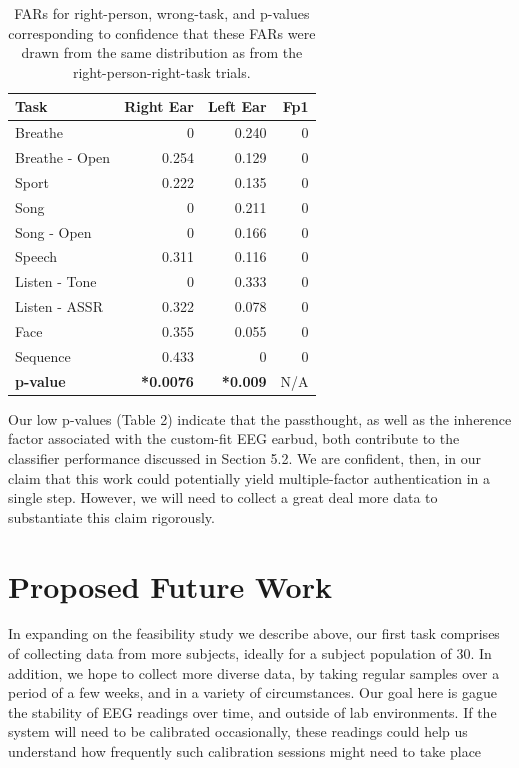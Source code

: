 \documentclass[11pt]{article}
\begin{document}
\begin{table}[h]
\centering
\caption{FARs for right-person, wrong-task, and p-values corresponding to confidence that these FARs were drawn from the same distribution as from the right-person-right-task trials.}
\begin{tabular}{lrrr}
\textbf{Task} & \textbf{Right Ear} & \textbf{Left Ear} & \textbf{Fp1}\\
\hline
Breathe & 0 & 0.240 & 0\\
Breathe - Open & 0.254 & 0.129 & 0\\
Sport & 0.222 & 0.135 & 0\\
Song & 0 & 0.211 & 0\\
Song - Open & 0 & 0.166 & 0\\
Speech & 0.311 & 0.116 & 0\\
Listen - Tone & 0 & 0.333 & 0\\
Listen - ASSR & 0.322 & 0.078 & 0\\
Face & 0.355 & 0.055 & 0\\
Sequence & 0.433 & 0 & 0\\
\hline
\textbf{p-value} & \textbf{*0.0076} & \textbf{*0.009} & N/A\\
\end{tabular}
\end{table}

Our low p-values (Table 2) indicate that the passthought, as well as the inherence
factor associated with the custom-fit EEG earbud, both contribute to the classifier
performance discussed in Section 5.2. We are confident, then, in our claim that this work
could potentially yield multiple-factor authentication in a single step. However, we
will need to collect a great deal more data to substantiate this claim rigorously.

\section{Proposed Future Work}

In expanding on the feasibility study we describe above, 
our first task comprises of collecting data from more subjects,
ideally for a subject population of 30.
In addition, we hope to collect more diverse data,
by taking regular samples over a period of a few weeks,
and in a variety of circumstances. Our goal here is gague the stability
of EEG readings over time, and outside of lab environments.
If the system will need to be calibrated occasionally, these readings
could help us understand how frequently such calibration sessions
might need to take place
\end{document}
